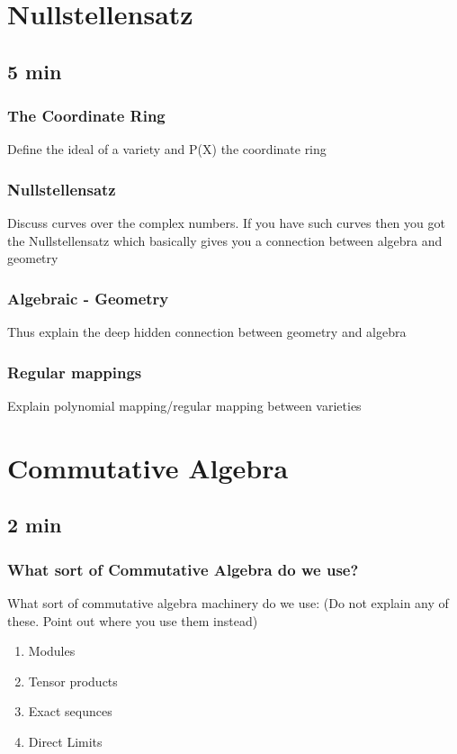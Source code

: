 \documentclass[pdf]{beamer}
\begin{document}
\section{Nullstellensatz}
\subsection{5 min}

\begin{frame}
    \frametitle{The Coordinate Ring}
        Define the ideal of a variety and P(X) the coordinate ring
\end{frame}

\begin{frame}
    \frametitle{Nullstellensatz}
    Discuss curves over the complex numbers. If you have such curves then you got the Nullstellensatz which basically gives you a connection between algebra and geometry
\end{frame}

\begin{frame}
    \frametitle{Algebraic - Geometry}
    Thus explain the deep  hidden connection between geometry and algebra
\end{frame}

\begin{frame}
    \frametitle{Regular mappings}
    Explain polynomial mapping/regular mapping between varieties
\end{frame}

\section{Commutative Algebra}
\subsection{2 min}

\begin{frame}
    \frametitle{What sort of Commutative Algebra do we use?}
    What sort of commutative algebra machinery do we use: (Do not explain any of these. Point out where you use them instead)
    \begin{enumerate}
        \item Modules
        \item Tensor products
        \item Exact sequnces
        \item Direct Limits
    \end{enumerate}
\end{frame}
\end{document}
